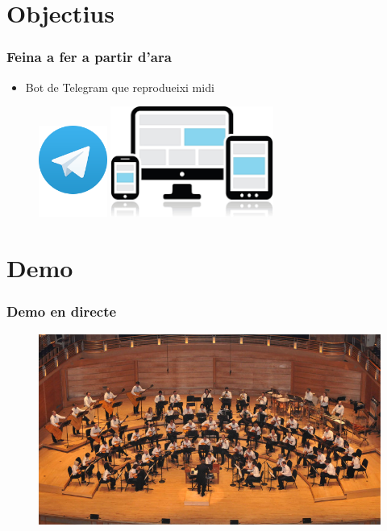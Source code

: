 \documentclass{beamer}
\begin{document}
\section{Objectius}
\begin{frame}
	\frametitle{Feina a fer a partir d'ara}
	\begin{itemize}[<+->]
		\item Bot de Telegram que reprodueixi midi
	\end{itemize}
	\begin{figure}
		\hfill
		\includegraphics[width=0.2\textwidth]{images/telegram}
		\hfill
		\includegraphics[width=0.475\textwidth]{images/mobile}
		\hfill
	\end{figure}
\end{frame}

\section{Demo}
\begin{frame}
	\frametitle{Demo en directe}
	\begin{figure}
		\includegraphics[width=\linewidth]{images/orchestra}
	\end{figure}
\end{frame}
\end{document}
